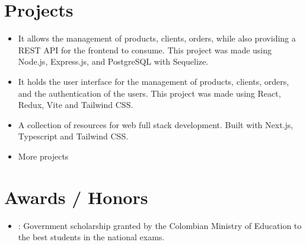 \documentclass[]{rahulworld-resume}
\begin{document}
\begin{minipage}[t]{0.66\textwidth}
    \section{Projects}

    \begin{itemize}
        \item
              \href{https://github.com/Ide-Pinturerias/pinturas-app-back}{} It allows the management of products, clients,
              orders, while also providing a REST API for the frontend to consume. This
              project was made using Node.js, Express.js, and PostgreSQL with Sequelize.

        \item
              \href{https://pinturas-app-front.vercel.app/}
              {} It holds the user
              interface for the management of products, clients, orders, and
              the authentication of the users. This project was made using
              React, Redux, Vite and Tailwind CSS.



        \item \href{https://resources-app.vercel.app/}{} A collection of resources for web full stack development. Built with
              Next.js, Typescript and Tailwind CSS.

        \item More projects
              \href{https://jamerrq.deno.dev/featured}{}

    \end{itemize}

    \section{Awards / Honors}

    \begin{itemize}
        \item {}: Government scholarship granted by the
              Colombian Ministry of Education to the best students in the national exams.
    \end{itemize}
\end{minipage}
\end{document}
